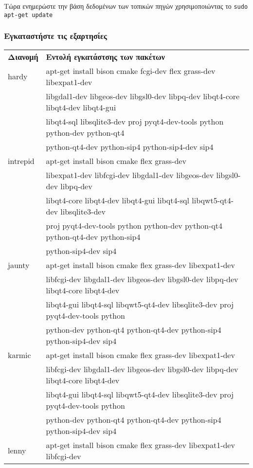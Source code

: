 Τώρα ενημερώστε την βάση δεδομένων των τοπικών πηγών χρησιμοποιώντας το \texttt{sudo apt-get update} 

\hypertarget{toc6}{}
\subsubsection{Εγκαταστήστε τις εξαρτησίες}
\begin{center}\begin{tabular}{|l|l|}
\hline \textbf{Διανομή} & \textbf{Εντολή εγκατάστσης των πακέτων} \\
hardy & apt-get install  bison cmake fcgi-dev flex grass-dev libexpat1-dev \\
& libgdal1-dev libgeos-dev libgsl0-dev libpq-dev libqt4-core libqt4-dev libqt4-gui \\
& libqt4-sql libsqlite3-dev proj pyqt4-dev-tools python python-dev python-qt4 \\
& python-qt4-dev python-sip4 python-sip4-dev sip4 \\
\hline intrepid & apt-get install  bison cmake flex grass-dev \\
& libexpat1-dev libfcgi-dev libgdal1-dev libgeos-dev libgsl0-dev libpq-dev \\
& libqt4-core libqt4-dev libqt4-gui libqt4-sql libqwt5-qt4-dev libsqlite3-dev \\
& proj pyqt4-dev-tools python python-dev python-qt4 python-qt4-dev python-sip4 \\
& python-sip4-dev sip4 \\
\hline jaunty & apt-get install  bison cmake flex grass-dev libexpat1-dev \\
& libfcgi-dev libgdal1-dev libgeos-dev libgsl0-dev libpq-dev libqt4-core libqt4-dev \\
& libqt4-gui libqt4-sql libqwt5-qt4-dev libsqlite3-dev proj pyqt4-dev-tools python \\
& python-dev python-qt4 python-qt4-dev python-sip4 python-sip4-dev sip4 \\
\hline karmic & apt-get install  bison cmake flex grass-dev libexpat1-dev \\
& libfcgi-dev libgdal1-dev libgeos-dev libgsl0-dev libpq-dev libqt4-core libqt4-dev \\
& libqt4-gui libqt4-sql libqwt5-qt4-dev libsqlite3-dev proj pyqt4-dev-tools python \\
& python-dev python-qt4 python-qt4-dev python-sip4 python-sip4-dev sip4 \\
\hline lenny & apt-get install  bison cmake flex grass-dev libexpat1-dev libfcgi-dev \\

\end{tabular}
\end{center}
